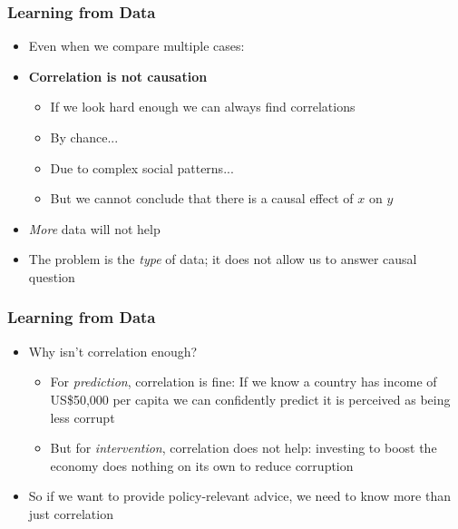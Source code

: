 \documentclass[xcolor=x11names,compress]{beamer}\usepackage[]{graphicx}\usepackage[]{color}
\renewcommand{\(}{\begin{columns}}
\renewcommand{\)}{\end{columns}}
\newcommand{\<}[1]{\begin{column}{#1}}
\renewcommand{\>}{\end{column}}
\begin{document}
\begin{frame}
\frametitle{Learning from Data}
\begin{itemize}
\item Even when we compare multiple cases: 
\item \textbf{Correlation is not causation}
\begin{itemize}
\item If we look hard enough we can always find correlations
\item By chance...
\item Due to complex social patterns...
\item But we cannot conclude that there is a causal effect of $x$ on $y$
\end{itemize}
\item \textit{More} data will not help
\item The problem is the \textit{type} of data; it does not allow us to answer causal question 
\end{itemize}
\end{frame}











\begin{frame}
\frametitle{Learning from Data}
\begin{itemize}
\item Why isn't correlation enough?
\begin{itemize}
\item For \textit{prediction}, correlation is fine: If we know a country has income of US\$50,000 per capita we can confidently predict it is perceived as being less corrupt
\item But for \textit{intervention}, correlation does not help: investing to boost the economy does nothing on its own to reduce corruption
\end{itemize}
\item So if we want to provide policy-relevant advice, we need to know more than just correlation
\end{itemize}
\end{frame}
\end{document}
